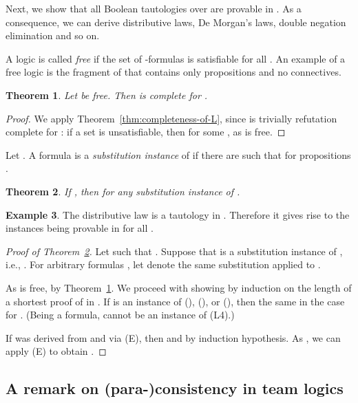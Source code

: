 \documentclass[a4paper,english,fleqn,11pt,final]{scrartcl}
\makeatletter
\newcommand{\ie}{i.e.\@\xspace}
\newcommand{\Deriv}[1]{{\normalfont\textsf{#1}}}
\theoremstyle{plain}
\newtheorem{theorem}{Theorem}[section]
\theoremstyle{definition}
\newtheorem{example}[theorem]{Example}
\makeatother
\begin{document}
Next, we show that all Boolean tautologies over  are provable in .
As a consequence, we can derive distributive laws, De Morgan's laws, double negation elimination and so on.

A logic  is called \emph{free} if the set  of -formulas is satisfiable for all .
An example of a free logic is the fragment  of  that contains only propositions and no connectives.

\begin{theorem}\label{thm:completeness-of-l-2}
Let  be free.
Then  is complete for .
\end{theorem}
\begin{proof}
We apply Theorem~\ref{thm:completeness-of-L}, since  is trivially refutation complete for : if a set  is unsatisfiable, then  for some , as  is free.
\end{proof}

Let .
A formula  is a \emph{substitution instance} of  if there are  such that  for propositions .

\begin{theorem}\label{thm:completeness-bool}
If , then  for any substitution instance  of .
\end{theorem}

\begin{example}
The distributive law  is a tautology in .
Therefore it gives rise to the instances  being provable in  for all .
\end{example}


\begin{proof}[Proof of Theorem~\ref{thm:completeness-bool}]
Let  such that .
Suppose that  is a substitution instance of , \ie, .
For arbitrary formulas , let  denote the same substitution applied to .

As  is free,  by Theorem~\ref{thm:completeness-of-l-2}.
We proceed with showing  by induction on the length of a shortest proof of  in .
If  is an instance of \Deriv{()}, \Deriv{()}, or \Deriv{()}, then the same in the case for .
(Being a  formula,  cannot be an instance of \Deriv{(L4)}.)

If  was derived from  and  via \Deriv{(E)}, then  and  by induction hypothesis.
As , we can apply \Deriv{(E)} to obtain .
\end{proof}


\subsection{A remark on (para-)consistency in team logics}
\end{document}
